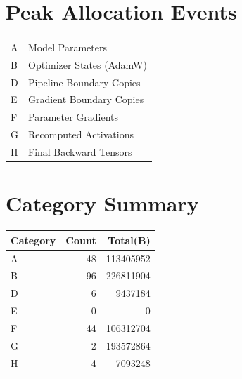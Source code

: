 \documentclass{article}
\begin{document}
\section*{Peak Allocation Events}
\small
\begin{tabular}{ll}
A & Model Parameters \\
B & Optimizer States (AdamW) \\
D & Pipeline Boundary Copies \\
E & Gradient Boundary Copies \\
F & Parameter Gradients \\
G & Recomputed Activations \\
H & Final Backward Tensors \\
\end{tabular}
\vspace{0.5em}
\section*{Category Summary}
\begin{tabular}{l r r}
Category & Count & Total(B) \\
\hline
A & 48 & 113405952 \\
B & 96 & 226811904 \\
D & 6 & 9437184 \\
E & 0 & 0 \\
F & 44 & 106312704 \\
G & 2 & 193572864 \\
H & 4 & 7093248 \\
\end{tabular}
\vspace{0.5em}
\end{document}
